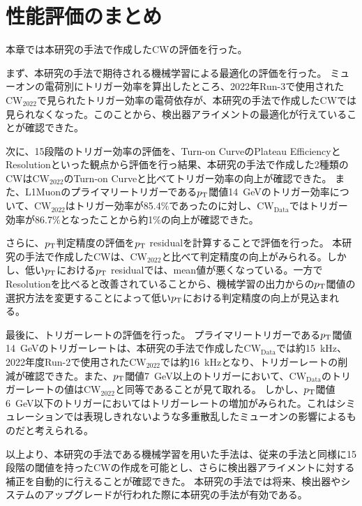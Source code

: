 \section{性能評価のまとめ}
本章では本研究の手法で作成したCWの評価を行った。

まず、本研究の手法で期待される機械学習による最適化の評価を行った。
ミューオンの電荷別にトリガー効率を算出したところ、2022年Run-3で使用された$\mathrm{CW_{2022}}$で見られたトリガー効率の電荷依存が、本研究の手法で作成したCWでは見られなくなった。このことから、検出器アライメントの最適化が行えていることが確認できた。

次に、15段階のトリガー効率の評価を、Turn-on CurveのPlateau EfficiencyとResolutionといった観点から評価を行っ結果、本研究の手法で作成した2種類のCWは$\mathrm{CW_{2022}}$のTurn-on Curveと比べてトリガー効率の向上が確認できた。
また、L1Muonのプライマリートリガーである$p_{\rm{T}}$閾値14~GeVのトリガー効率について、$\mathrm{CW_{2022}}$はトリガー効率が85.4$\%$であったのに対し、$\mathrm{CW_{Data}}$ではトリガー効率が86.7$\%$となったことから約1$\%$の向上が確認できた。

さらに、$p_{\rm{T}}$判定精度の評価を$p_{\rm{T}}$ residualを計算することで評価を行った。
本研究の手法で作成したCWは、$\mathrm{CW_{2022}}$と比べて判定精度の向上がみられる。しかし、低い$p_{\rm{T}}$における$p_{\rm{T}}$ residualでは、mean値が悪くなっている。一方でResolutionを比べると改善されていることから、機械学習の出力からの$p_{\rm{T}}$閾値の選択方法を変更することによって低い$p_{\rm{T}}$における判定精度の向上が見込まれる。

最後に、トリガーレートの評価を行った。
プライマリートリガーである$p_{\rm{T}}$閾値14~GeVのトリガーレートは、本研究の手法で作成した$\mathrm{CW_{Data}}$では約15~kHz、2022年度Run-2で使用された$\mathrm{CW_{2022}}$では約16~kHzとなり、トリガーレートの削減が確認できた。また、$p_{\rm{T}}$閾値7~GeV以上のトリガーにおいて、$\mathrm{CW_{Data}}$のトリガーレートの値は$\mathrm{CW_{2022}}$と同等であることが見て取れる。
しかし、$p_{\rm{T}}$閾値6~GeV以下のトリガーにおいてはトリガーレートの増加がみられた。これはシミュレーションでは表現しきれないような多重散乱したミューオンの影響によるものだと考えられる。

以上より、本研究の手法である機械学習を用いた手法は、従来の手法と同様に15段階の閾値を持ったCWの作成を可能とし、さらに検出器アライメントに対する補正を自動的に行えることが確認できた。
本研究の手法では将来、検出器やシステムのアップグレードが行われた際に本研究の手法が有効である。


